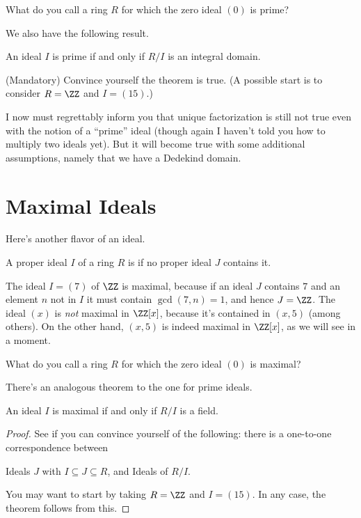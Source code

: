 \begin{exercise}
	What do you call a ring $R$ for which the zero ideal $(0)$ is prime?
\end{exercise}

We also have the following result.
\begin{theorem}
	An ideal $I$ is prime if and only if $R/I$ is an integral domain.
\end{theorem}
\begin{exercise}
	(Mandatory) Convince yourself the theorem is true.
	(A possible start is to consider $R = \ZZ$ and $I = (15)$.)
\end{exercise}

I now must regrettably inform you that unique factorization is still
not true even with the notion of a ``prime'' ideal
(though again I haven't told you how to multiply two ideals yet).
But it will become true with some additional assumptions,
namely that we have a Dedekind domain.

\section{Maximal Ideals}
Here's another flavor of an ideal.
\begin{definition}
	A proper ideal $I$ of a ring $R$ is  if
	no proper ideal $J$ contains it.
\end{definition}
\begin{example}
	\listhack
	\begin{enumerate}[(a)]
		\ii The ideal $I = (7)$ of $\ZZ$ is maximal, because
		if an ideal $J$ contains $7$
		and an element $n$ not in $I$
		it must contain $\gcd(7,n) = 1$, and hence $J = \ZZ$.
		\ii The ideal $(x)$ is \emph{not} maximal in $\ZZ[x]$,
		because it's contained in $(x,5)$ (among others).
		\ii On the other hand, $(x,5)$ is indeed maximal in $\ZZ[x]$,
		as we will see in a moment.
	\end{enumerate}
\end{example}

\begin{exercise}
	What do you call a ring $R$ for which the zero ideal $(0)$ is maximal?
\end{exercise}

There's an analogous theorem to the one for prime ideals.
\begin{theorem}
	An ideal $I$ is maximal if and only if $R/I$ is a field.
\end{theorem}
\begin{proof}
	See if you can convince yourself of the following:
	there is a one-to-one correspondence between
	\begin{enumerate}[(i)]
		\ii Ideals $J$ with $I \subseteq J \subseteq R$, and
		\ii Ideals of $R/I$.
	\end{enumerate}
	You may want to start by taking $R = \ZZ$ and $I = (15)$.
	In any case, the theorem follows from this.
\end{proof}

